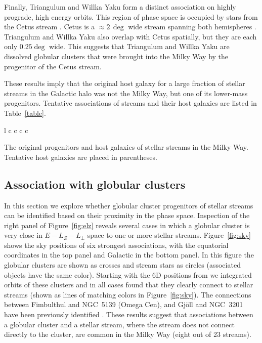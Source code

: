 \documentclass[twocolumn]{aastex63}
\newcommand{\feh}{\ensuremath{\textrm{[Fe/H]}}}
\begin{document}
Finally, Triangulum and Willka Yaku form a distinct association on highly prograde, high energy orbits.
This region of phase space is occupied by stars from the Cetus stream \citep{yuan2019}.
Cetus is a $\approx2\,\deg$ wide stream spanning both hemispheres \citep[the southern portion of the stream was identified as the Palca overdensity]{newberg2009, chang2020}.
Triangulum and Willka Yaku also overlap with Cetus spatially, but they are each only $0.25\deg$ wide.
This suggests that Triangulum and Willka Yaku are dissolved globular clusters that were brought into the Milky Way by the progenitor of the Cetus stream.

These results imply that the original host galaxy for a large fraction of stellar streams in the Galactic halo was not the Milky Way, but one of its lower-mass progenitors.
Tentative associations of streams and their host galaxies are listed in Table~\ref{table}.



\begin{deluxetable}{l c c c c}
\tablehead{
Name & Host Galaxy & Progenitor & Type & \feh
}
\decimals
\startdata

\enddata
\caption{
The original progenitors and host galaxies of stellar streams in the Milky Way.
Tentative host galaxies are placed in parentheses.
}
\label{table}
\end{deluxetable}


\subsection{Association with globular clusters}
\label{sec:progenitors}
In this section we explore whether globular cluster progenitors of stellar streams can be identified based on their proximity in the phase space.
Inspection of the right panel of Figure~\ref{fig:elz} reveals several cases in which a globular cluster is very close in $E-L_Z-L_\perp$ space to one or more stellar streams.
Figure~\ref{fig:sky} shows the sky positions of six strongest associations, with the equatorial coordinates in the top panel and Galactic in the bottom panel.
In this figure the globular clusters are shown as crosses and stream stars as circles (associated objects have the same color).
Starting with the 6D positions from \citet{baumgardt2019} we integrated orbits of these clusters and in all cases found that they clearly connect to stellar streams (shown as lines of matching colors in Figure~\ref{fig:sky}).
The connections between Fimbulthul and NGC~5139 (Omega Cen), and Gj\" oll and NGC~3201 have been previously identified \citep[respectively]{ibata2019b, hansen2020}.
These results suggest that associations between a globular cluster and a stellar stream, where the stream does not connect directly to the cluster, are common in the Milky Way (eight out of 23 streams).
\end{document}
